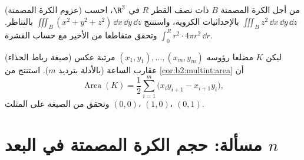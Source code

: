\begin{exercise}[$\star\star$]\label{exo:b2:multint:11}
(عزوم الكرة المصمتة) من أجل الكرة المصمتة $B$ ذات نصف القطر
$R$ في $\R^3$، احسب $\iiint_B z^2\,\dd x\,\dd y\,\dd z$ بالإحداثيات الكروية، واستنتج $\iiint_B (x^2 + y^2 +
z^2)\,\dd x\,\dd y\,\dd z$
بالتناظر. وتحقق متقاطعا من الأخير مع حساب القشرة $\int_0^R r^2\cdot4\pi
r^2\,\dd r$.
\end{exercise}

\begin{exercise}[$\star\star$]\label{exo:b2:multint:12}
(صيغة رباط الحذاء) ليكن $K$ مضلعا رؤوسه $(x_1,
y_1), \dots, (x_m, y_m)$ مرتبة عكس عقارب
الساعة (بالأدلة بترديد $m$). استنتج من \cref{cor:b2:multint:area} أن
\[
\operatorname{Area}(K)
= \frac12\sum_{i=1}^m
\bigl(x_iy_{i+1} - x_{i+1}y_i\bigr) ,
\]
وتحقق من الصيغة على المثلث $(0,0)$، $(1,0)$، $(0,1)$.
\end{exercise}

\section{مسألة: حجم الكرة المصمتة في البعد $n$}

